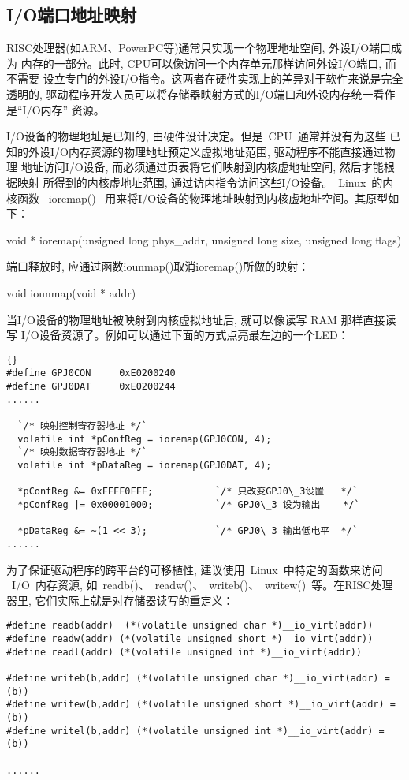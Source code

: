 \subsection{I/O端口地址映射}
	RISC处理器(如ARM、PowerPC等)通常只实现一个物理地址空间, 外设I/O端口成为
内存的一部分。此时, CPU可以像访问一个内存单元那样访问外设I/O端口, 而不需要
设立专门的外设I/O指令。这两者在硬件实现上的差异对于软件来说是完全透明的, 
驱动程序开发人员可以将存储器映射方式的I/O端口和外设内存统一看作是``I/O内存''
资源。

	I/O设备的物理地址是已知的, 由硬件设计决定。但是~CPU~通常并没有为这些
已知的外设I/O内存资源的物理地址预定义虚拟地址范围, 驱动程序不能直接通过物理
地址访问I/O设备, 而必须通过页表将它们映射到内核虚地址空间, 然后才能根据映射
所得到的内核虚地址范围, 通过访内指令访问这些I/O设备。~Linux~的内核函数
~ioremap()~ 用来将I/O设备的物理地址映射到内核虚地址空间。其原型如下：

	void * ioremap(unsigned long phys\_addr, unsigned long size, unsigned long
flags)

	端口释放时, 应通过函数iounmap()取消ioremap()所做的映射：

	void iounmap(void * addr)

	当I/O设备的物理地址被映射到内核虚拟地址后, 就可以像读写 RAM 那样直接读写
I/O设备资源了。例如可以通过下面的方式点亮最左边的一个LED：

\begin{boxedminipage}{.9\textwidth}
\lstset{language=c,escapeinside=``}
\begin{lstlisting}{}
#define	GPJ0CON		0xE0200240
#define	GPJ0DAT		0xE0200244
......

  `/* 映射控制寄存器地址 */`
  volatile int *pConfReg = ioremap(GPJ0CON, 4);
  `/* 映射数据寄存器地址 */`
  volatile int *pDataReg = ioremap(GPJ0DAT, 4);

  *pConfReg &= 0xFFFF0FFF;           `/* 只改变GPJ0\_3设置   */`
  *pConfReg |= 0x00001000;           `/* GPJ0\_3 设为输出    */`

  *pDataReg &= ~(1 << 3);            `/* GPJ0\_3 输出低电平  */`
......
\end{lstlisting}
\end{boxedminipage}
	
	为了保证驱动程序的跨平台的可移植性, 建议使用~Linux~中特定的函数来访问
~I/O~内存资源, 如~readb()、~readw()、~writeb()、~writew()~等。在RISC处理器里, 
它们实际上就是对存储器读写的重定义：

\begin{boxedminipage}{.9\textwidth}
\begin{verbatim}
#define readb(addr)  (*(volatile unsigned char *)__io_virt(addr))
#define readw(addr) (*(volatile unsigned short *)__io_virt(addr))
#define readl(addr) (*(volatile unsigned int *)__io_virt(addr))

#define writeb(b,addr) (*(volatile unsigned char *)__io_virt(addr) = (b))
#define writew(b,addr) (*(volatile unsigned short *)__io_virt(addr) = (b))
#define writel(b,addr) (*(volatile unsigned int *)__io_virt(addr) = (b))

......
\end{verbatim}
\end{boxedminipage}

